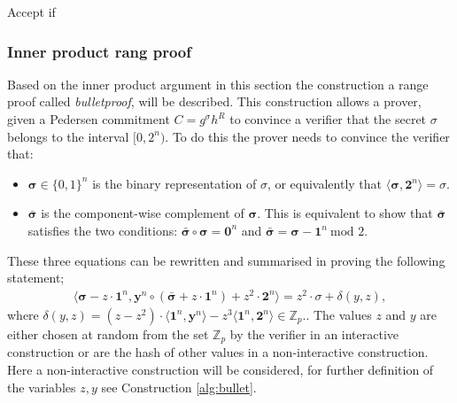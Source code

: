 \begin{algorithm}[H]
\begin{itemize}
Accept if 
\end{itemize}
\label{alg:inner_product}
\end{algorithm}

 


\subsubsection*{Inner product rang proof}
Based on the inner product argument  in this section the construction a range proof called  \textit{bulletproof}, will be described. This construction allows a prover, given a Pedersen commitment $C=g^\sigma h^R$ to convince a verifier that the secret $\sigma$ belongs to the interval $[0,2^n)$. To do this the prover needs to convince the verifier that:
\begin{itemize}
    \item $\bm{\sigma}\in\{0,1\}^n$ is the binary representation of $\sigma$, or equivalently that $\langle \bm{\sigma},\mathbf{2}^n\rangle = \sigma$.
    \item $\bm{\bar{\sigma}}$ is the component-wise complement of $\bm{\sigma}$. This is equivalent to show that $\bm{\bar{\sigma}}$ satisfies the two conditions: $\bm{\bar{\sigma}}\circ \bm{\sigma}=\bm{0}^n$ and $\bm{\bar{\sigma}} = \bm{\sigma} -\bm{1}^n \: \text{mod }2$.
\end{itemize}
These three equations can be rewritten and summarised in proving the following statement;
\begin{align}
    \big\langle \bm{\sigma} -z\cdot \bm{1}^n, \bm{y}^n\circ (\bm{\bar{\sigma}} + z \cdot\bm{1}^n) + z^2\cdot\bm{2}^n \big\rangle = z^2\cdot\sigma + \delta(y,z),
    \label{eq:range_non_zero}
\end{align}
where $\delta(y,z) = (z-z^2)\cdot\langle\bm{1}^n,\bm{y}^n\rangle-z^3\langle \bm{1}^n,\bm{2}^n\rangle\in\mathds{Z}_p.$.
The values $z$ and $y$ are either chosen at random from the set $\mathds{Z}_p$ by the verifier in an interactive construction or are the hash of other values in a non-interactive construction. Here a non-interactive construction will be considered, for further definition of the variables $z,y$ see Construction \ref{alg:bullet}.

